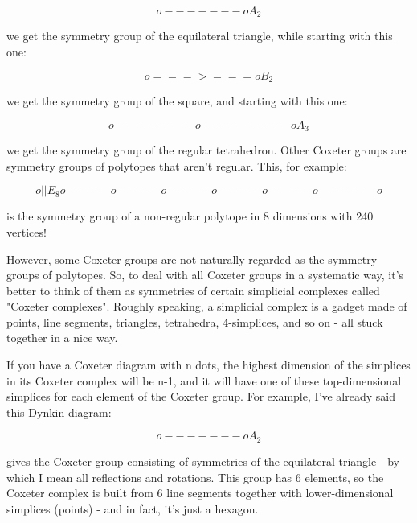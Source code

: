 $$

                           o-------o                  A_{2}
$$
    
we get the symmetry group of the equilateral triangle, while starting
with this one:


$$

                           o===>===o                  B_{2}
$$
    
we get the symmetry group of the square, and starting with this one:



$$

                       o-------o--------o             A_{3}
$$
    
we get the symmetry group of the regular tetrahedron.  Other Coxeter
groups are symmetry groups of polytopes that aren't regular.   This, 
for example:


$$

                                     o
                                     | 
                                     |                E_{8}
                 o----o----o----o----o----o-----o
$$
    
is the symmetry group of a non-regular polytope in 8 dimensions with 240 
vertices!   

However, some Coxeter groups are not naturally regarded as the symmetry
groups of polytopes.  So, to deal with all Coxeter groups in a
systematic way, it's better to think of them as symmetries of certain
simplicial complexes called "Coxeter complexes".  Roughly speaking, a
simplicial complex is a gadget made of points, line segments, triangles,
tetrahedra, 4-simplices, and so on - all stuck together in a nice way.

If you have a Coxeter diagram with n dots, the highest dimension of  the
simplices in its Coxeter complex will be n-1, and it will have one of
these top-dimensional simplices for each element of the Coxeter group. 
For example, I've already said this Dynkin diagram:  


$$

                           o-------o                   A_{2}
$$
    
gives the Coxeter group consisting of symmetries of the equilateral
triangle - by which I mean all reflections and rotations.  This group
has 6 elements, so the Coxeter complex is built from 6 line segments
together with lower-dimensional simplices (points) - and in fact, it's 
just a hexagon.    

